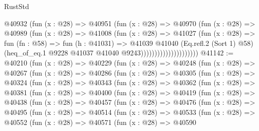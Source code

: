 \begin{lexlean}{RustStd}
\begin{coremodule}
                              @40932
                                (fun (x : @28) =>
                                @40951
                                  (fun (x : @28) =>
                                  @40970
                                    (fun (x : @28) =>
                                    @40989
                                      (fun (x : @28) =>
                                      @41008
                                        (fun (x : @28) =>
                                        @41027
                                          (fun (x : @28) =>
                                          fun (fn : @58) =>
                                          fun (h : @41031) =>
                                          @41039
                                            @41040
                                            (Eq.refl.{2} (Sort 1) @58)
                                            (heq_of_eq.{1}
                                              @9228
                                              @41037
                                              @41040
                                              @9243)))))))))))))))))))))
@41142 := @40210
    (fun (x : @28) =>
    @40229
      (fun (x : @28) =>
      @40248
        (fun (x : @28) =>
        @40267
          (fun (x : @28) =>
          @40286
            (fun (x : @28) =>
            @40305
              (fun (x : @28) =>
              @40324
                (fun (x : @28) =>
                @40343
                  (fun (x : @28) =>
                  @40362
                    (fun (x : @28) =>
                    @40381
                      (fun (x : @28) =>
                      @40400
                        (fun (x : @28) =>
                        @40419
                          (fun (x : @28) =>
                          @40438
                            (fun (x : @28) =>
                            @40457
                              (fun (x : @28) =>
                              @40476
                                (fun (x : @28) =>
                                @40495
                                  (fun (x : @28) =>
                                  @40514
                                    (fun (x : @28) =>
                                    @40533
                                      (fun (x : @28) =>
                                      @40552
                                        (fun (x : @28) =>
                                        @40571
                                          (fun (x : @28) =>
                                          @40590

\end{coremodule}
\end{lexlean}
